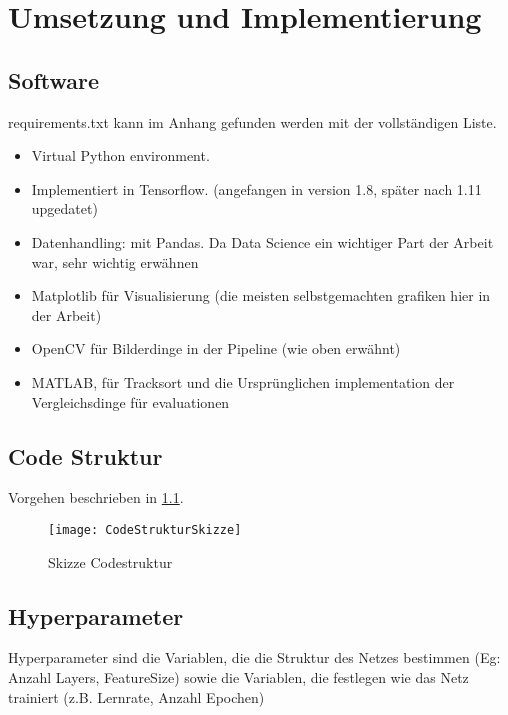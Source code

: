 \chapter{Umsetzung und Implementierung}

\section{Software}

requirements.txt kann im Anhang gefunden werden mit der vollständigen Liste.

\begin{itemize}
    \item Virtual Python environment.
    \item Implementiert in Tensorflow. (angefangen in version 1.8, später nach 1.11 upgedatet)
    \item Datenhandling: mit Pandas. Da Data Science ein wichtiger Part der Arbeit war, sehr wichtig erwähnen
    \item Matplotlib für Visualisierung (die meisten selbstgemachten grafiken hier in der Arbeit)
    \item OpenCV für Bilderdinge in der Pipeline (wie oben erwähnt)
    \item MATLAB, für Tracksort und die Ursprünglichen implementation der Vergleichsdinge für evaluationen 
\end{itemize}


\section{Code Struktur}

Vorgehen beschrieben in \ref{CodeStruktur}.

\begin{figure}
    \centering
    \texttt{[image: CodeStrukturSkizze]}
    \caption{Skizze Codestruktur}
    \label{CodeStruktur}
\end{figure}
  

\section{Hyperparameter}

Hyperparameter sind die Variablen, die die Struktur des Netzes bestimmen (Eg: Anzahl Layers, FeatureSize) 
sowie die Variablen, die festlegen wie das Netz trainiert (z.B. Lernrate, Anzahl Epochen)


